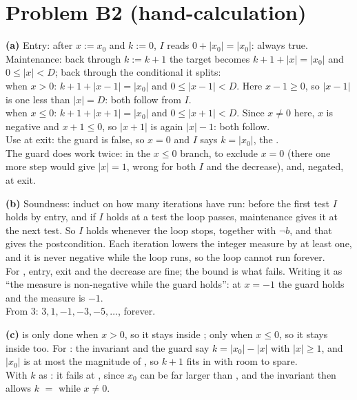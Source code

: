 \documentclass[11pt]{article}
\begin{document}
\section*{Problem B2 (hand-calculation)}\label{ans:B2}
\begin{answer}
\textbf{(a)} Entry: after $x := x_0$ and $k := 0$, $I$ reads $0 + \lvert
x_0\rvert = \lvert x_0\rvert$: always true. \\
Maintenance: back through $k := k + 1$ the target becomes $k + 1 + \lvert
x\rvert = \lvert x_0\rvert$ and $0 \leq \lvert x\rvert < D$; back through the
conditional it splits: \\
\hspace*{2em} when $x > 0$: $k + 1 + \lvert x - 1\rvert = \lvert x_0\rvert$ and
$0 \leq \lvert x - 1\rvert < D$. Here $x - 1 \geq 0$, so $\lvert x - 1\rvert$
is one less than $\lvert x\rvert = D$: both follow from $I$. \\
\hspace*{2em} when $x \leq 0$: $k + 1 + \lvert x + 1\rvert = \lvert x_0\rvert$
and $0 \leq \lvert x + 1\rvert < D$. Since $x \neq 0$ here, $x$ is negative and
$x + 1 \leq 0$, so $\lvert x + 1\rvert$ is again $\lvert x\rvert - 1$: both
follow. \\
Use at exit: the guard is false, so $x = 0$ and $I$ says $k = \lvert
x_0\rvert$, the . \\
The guard does work twice: in the $x \leq 0$ branch, to exclude $x = 0$ (there
one more step would give $\lvert x\rvert = 1$, wrong for both $I$ and the
decrease), and, negated, at exit.

\textbf{(b)} Soundness: induct on how many iterations have run: before the
first test $I$ holds by entry, and if $I$ holds at a test the loop passes,
maintenance gives it at the next test. So $I$ holds whenever the loop stops,
together with $\neg b$, and that gives the postcondition. Each iteration
lowers the integer measure by at least one, and it is never negative while
the loop runs, so the loop cannot run forever. \\
For , entry, exit and the decrease are fine; the bound is what
fails. Writing it as ``the measure is non-negative while the guard holds'':
at $x = -1$ the guard holds and the measure is $-1$. \\
From $3$: $3, 1, -1, -3, -5, \ldots$, forever.

\textbf{(c)}  is only done when $x > 0$, so it stays inside
;  only when $x \leq 0$, so it stays inside too. For
: the invariant and the guard say $k = \lvert x_0\rvert - \lvert
x\rvert$ with $\lvert x\rvert \geq 1$, and $\lvert x_0\rvert$ is at most the
magnitude of , so $k + 1$ fits in  with room to spare.
\\
With $k$ as : it fails at , since $x_0$ can be far larger
than , and the invariant then allows $k$ $=$ 
while $x \neq 0$.
\end{answer}
\end{document}
